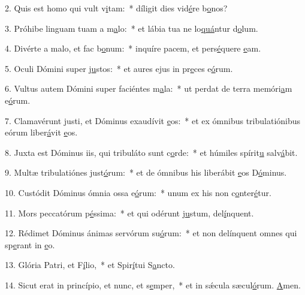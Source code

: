 2. Quis est homo qui vult v\uline{i}tam:~* díligit dies vid\uline{é}re b\uline{o}nos?\par 
3. Próhibe linguam tuam a m\uline{a}lo:~* et lábia tua ne lo\uline{quá}ntur d\uline{o}lum.\par 
4. Divérte a malo, et fac b\uline{o}num:~* inquíre pacem, et pers\uline{é}quere \uline{e}am.\par 
5. Oculi Dómini super j\uline{u}stos:~* et aures ejus in pr\uline{e}ces e\uline{ó}rum.\par 
6. Vultus autem Dómini super faciéntes m\uline{a}la:~* ut perdat de terra memóri\uline{a}m e\uline{ó}rum.\par 
7. Clamavérunt justi, et Dóminus exaudívit \uline{e}os:~* et ex ómnibus tribulatiónibus eórum liber\uline{á}vit \uline{e}os.\par 
8. Juxta est Dóminus iis, qui tribuláto sunt c\uline{o}rde:~* et húmiles spírit\uline{u} salv\uline{á}bit.\par 
9. Multæ tribulatiónes just\uline{ó}rum:~* et de ómnibus his liberábit \uline{e}os D\uline{ó}minus.\par 
10. Custódit Dóminus ómnia ossa e\uline{ó}rum:~* unum ex his non c\uline{o}nter\uline{é}tur.\par 
11. Mors peccatórum p\uline{é}ssima:~* et qui odérunt j\uline{u}stum, del\uline{í}nquent.\par 
12. Rédimet Dóminus ánimas servórum su\uline{ó}rum:~* et non delínquent omnes qui sp\uline{e}rant in \uline{e}o.\par 
13. Glória Patri, et F\uline{í}lio,~* et Spir\uline{í}tui S\uline{a}ncto.\par 
14. Sicut erat in princípio, et nunc, et s\uline{e}mper,~* et in sǽcula sæcul\uline{ó}rum. \uline{A}men.\par 
